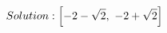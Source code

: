 \documentclass[preview]{standalone}
\begin{document}
\begin{align*}
\special{dvisvgm:raw <g id='unique000'>}Solution: \left[ -2 - \sqrt{2}, \  -2 + \sqrt{2}\right]\special{dvisvgm:raw </g>}
\end{align*}
\end{document}
